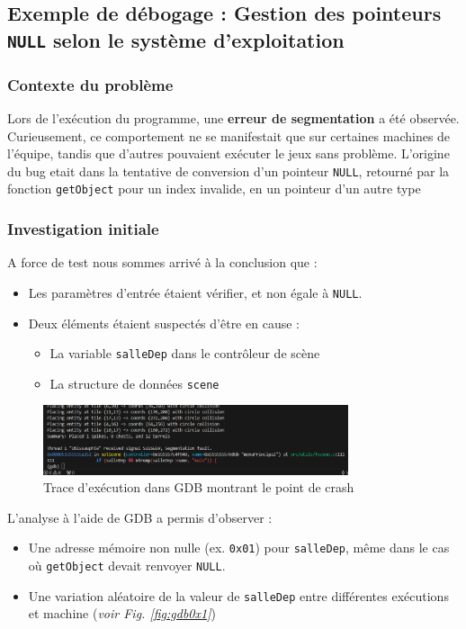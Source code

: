 \documentclass[a4paper,11pt]{article}
\begin{document}
\subsection{Exemple de débogage : Gestion des pointeurs \texttt{NULL} selon le système d'exploitation}
\subsubsection{Contexte du problème}
Lors de l'exécution du programme, une \textbf{erreur de segmentation} a été observée. Curieusement, ce comportement ne se manifestait que sur certaines machines de l'équipe, tandis que d'autres pouvaient exécuter le jeux sans problème. 
L'origine du bug etait dans la tentative de conversion d'un pointeur \texttt{NULL}, retourné par la fonction \texttt{getObject} pour un index invalide, en un pointeur d'un autre type

\subsubsection{Investigation initiale}
A force de test nous sommes arrivé à la conclusion que :
\begin{itemize} 
    \item Les paramètres d'entrée étaient vérifier, et non égale à \texttt{NULL}. 
    \item Deux éléments étaient suspectés d'être en cause : 
    \begin{itemize} \item La variable \texttt{salleDep} dans le contrôleur de scène 
    \item La structure de données \texttt{scene} 
    \end{itemize} 
\end{itemize}

\begin{figure}[ht]
\centering
\includegraphics[width=0.8\textwidth]{./img/gdbSIGEGV.png}
\caption{Trace d'exécution dans GDB montrant le point de crash}
\label{fig:gdbSIGEGV}
\end{figure}

\newpage
L'analyse à l'aide de GDB a permis d'observer : 
\begin{itemize} 
    \item Une adresse mémoire non nulle (ex. \texttt{0x01}) pour \texttt{salleDep}, même dans le cas où \texttt{getObject} devait renvoyer \texttt{NULL}. 
    \item Une variation aléatoire de la valeur de \texttt{salleDep} entre différentes exécutions et machine (\textit{voir Fig. \ref{fig:gdb0x1}})
\end{itemize}
\end{document}
